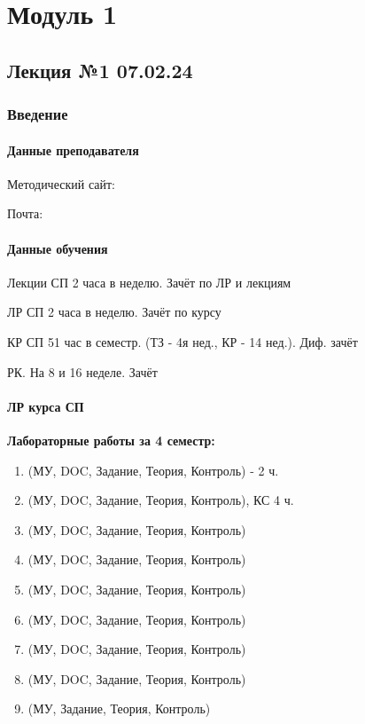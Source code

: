 \part{Модуль 1}

\chapter{Лекция №1 07.02.24}

\section{Введение}

\subsection{Данные преподавателя}

Методический сайт: 

Почта: 

\subsection{Данные обучения}

Лекции СП 2 часа в неделю. Зачёт по ЛР и лекциям

ЛР СП 2 часа в неделю. Зачёт по курсу

КР СП 51 час в семестр. (ТЗ - 4я нед., КР - 14 нед.). Диф. зачёт

РК. На 8 и 16 неделе. Зачёт

\subsection{ЛР курса СП}

\textbf{Лабораторные работы за 4 семестр:}
\begin{enumerate}
    \item {} (МУ, DOC, Задание, Теория, Контроль) - 2 ч.
    \item {} (МУ, DOC, Задание, Теория, Контроль), КС 4 ч.
    \item {} (МУ, DOC, Задание, Теория, Контроль)
    \item {} (МУ, DOC, Задание, Теория, Контроль)
    \item {} (МУ, DOC, Задание, Теория, Контроль)
    \item {} (МУ, DOC, Задание, Теория, Контроль)
    \item {} (МУ, DOC, Задание, Теория, Контроль)
    \item {} (МУ, DOC, Задание, Теория, Контроль)
    \item {} (МУ, Задание, Теория, Контроль)
\end{enumerate}

